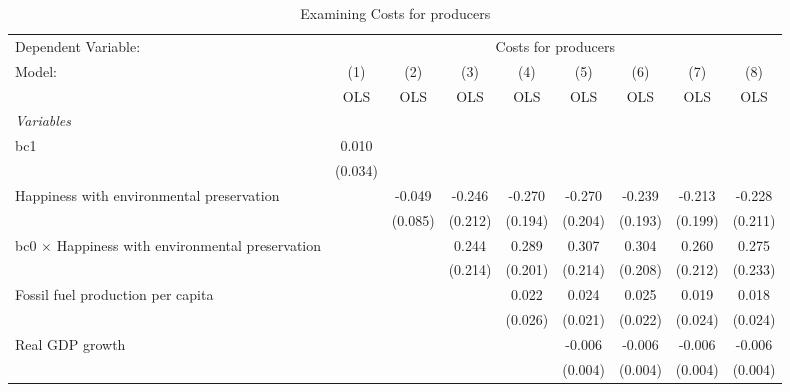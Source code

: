 
\begin{table}[htbp]
   \caption{Examining Costs for producers}
   \centering
   \begin{tabular}{lcccccccc}
      \toprule
      Dependent Variable: & \multicolumn{8}{c}{Costs for producers}\\
      Model:                                                  & (1)     & (2)     & (3)     & (4)     & (5)     & (6)     & (7)           & (8)\\  
                                                              &  OLS    & OLS     & OLS     & OLS     & OLS     & OLS     & OLS           & OLS\\  
      \midrule
      \emph{Variables}\\
      bc1                                                     & 0.010   &         &         &         &         &         &               &   \\   
                                                              & (0.034) &         &         &         &         &         &               &   \\   
      Happiness with environmental preservation               &         & -0.049  & -0.246  & -0.270  & -0.270  & -0.239  & -0.213        & -0.228\\   
                                                              &         & (0.085) & (0.212) & (0.194) & (0.204) & (0.193) & (0.199)       & (0.211)\\   
      bc0 $\times$ Happiness with environmental preservation  &         &         & 0.244   & 0.289   & 0.307   & 0.304   & 0.260         & 0.275\\   
                                                              &         &         & (0.214) & (0.201) & (0.214) & (0.208) & (0.212)       & (0.233)\\   
      Fossil fuel production per capita                       &         &         &         & 0.022   & 0.024   & 0.025   & 0.019         & 0.018\\   
                                                              &         &         &         & (0.026) & (0.021) & (0.022) & (0.024)       & (0.024)\\   
      Real GDP growth                                         &         &         &         &         & -0.006  & -0.006  & -0.006        & -0.006\\   
                                                              &         &         &         &         & (0.004) & (0.004) & (0.004)       & (0.004)\\   

\end{tabular}
\end{table}
